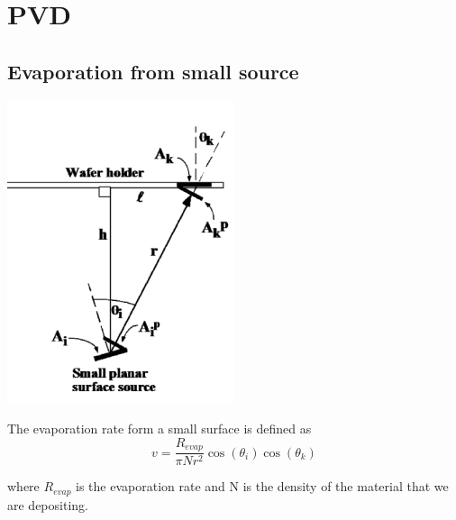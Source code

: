 \section{PVD}

\subsection{Evaporation from small source}

\centering
\includegraphics[width=0.5\textwidth]{CVD_evap.png}\\
\raggedright


The evaporation rate form a small surface is defined as 
\begin{equation}
v=\frac{R_{evap}}{\pi N r^2}\cos(\theta_i )\cos(\theta_k)
\end{equation}

where $R_{evap}$ is the evaporation rate and N is the density of the material that we are depositing.\\



























